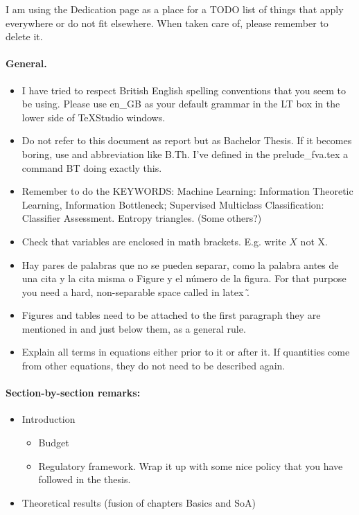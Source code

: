 {\color{red} %
I am using the Dedication page as a place for a TODO list of things that apply everywhere or do not fit elsewhere. When taken care of, please remember to delete it. 

\paragraph{General. }

\begin{itemize}

\item I have tried to  respect British English spelling conventions that you seem to be using. Please use en\_GB as your default grammar in the LT box in the lower side of TeXStudio windows. 

\item Do not refer to this document as report but as Bachelor Thesis. If it becomes boring, use and abbreviation like B.Th. I've defined in  the prelude\_fva.tex a command {}BT doing exactly this.

\item Remember to do the KEYWORDS: Machine Learning: Information Theoretic Learning, Information Bottleneck; Supervised Multiclass Classification: Classifier Assessment. Entropy triangles. (Some others?)

\item Check that variables are enclosed in math brackets. E.g. write $X$ not X.

\item Hay pares de palabras que no se pueden separar, como la palabra antes de una cita y la cita misma o Figure y el n\'umero de la figura. For that purpose you need a hard, non-separable space called in latex \~.

\item Figures and tables need to be attached to the first paragraph they are mentioned in and just below them, as a general rule. 

\item Explain all terms in equations either prior to it or after it. If quantities come from other equations, they do not need to be described again. 
\end{itemize}

\paragraph{Section-by-section remarks: }
\begin{itemize}
\item Introduction

\begin{itemize}
\item Budget

\item  Regulatory framework. Wrap it up with some nice policy that you have followed in the thesis. 
\end{itemize} 

\item Theoretical results (fusion of chapters Basics and SoA)



\end{itemize}
} %
